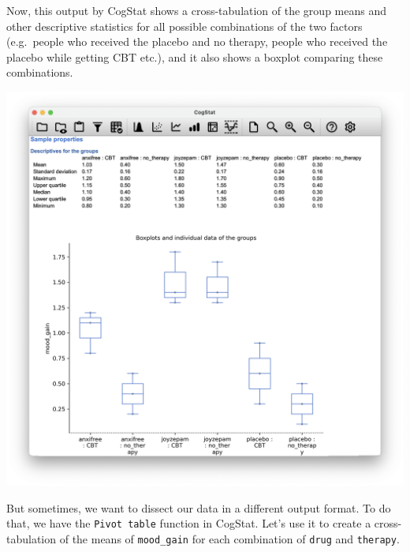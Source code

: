 \documentclass[
  11pt,
  a4paper,
  twoside,symmetric,openright]{book}
\theoremstyle{break}
\theoremstyle{break}
\begin{document}
Now, this output by CogStat shows a cross-tabulation of the group means and other descriptive statistics for all possible combinations of the two factors (e.g.~people who received the placebo and no therapy, people who received the placebo while getting CBT etc.), and it also shows a boxplot comparing these combinations.

\begin{center}\includegraphics[width=0.6\linewidth]{resources/image/cogstatanova2boxplotclinical} \end{center}

But sometimes, we want to dissect our data in a different output format. To do that, we have the \texttt{Pivot\ table} function in CogStat. Let's use it to create a cross-tabulation of the means of \texttt{mood\_gain} for each combination of \texttt{drug} and \texttt{therapy}.
\end{document}
